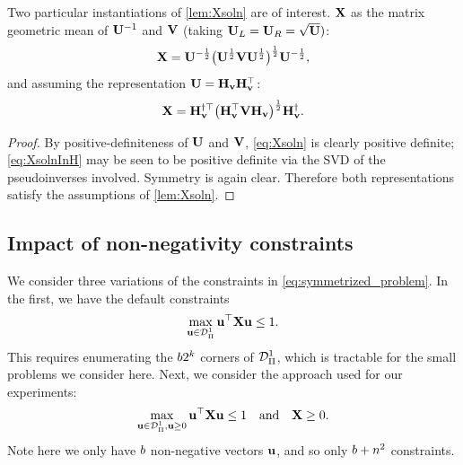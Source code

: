 \begin{cor}\label{cor:reps_for_x}
Two particular instantiations of \cref{lem:Xsoln} are of interest. $\mathbf{X}$ as the matrix geometric mean of $\mathbf{U}^{-1}$ and $\mathbf{V}$ (taking $\mathbf{U}_L = \mathbf{U}_R = \sqrt{\mathbf{U}})$:
\begin{equation}\label{eq:Xsoln}
\mathbf{X} = \mathbf{U}^{-\frac{1}{2}} \big(\mathbf{U}^\frac{1}{2} \mathbf{V} \mathbf{U}^\frac{1}{2} \big)^\frac{1}{2} \mathbf{U}^{-\frac{1}{2}},
\end{equation}
and assuming the representation $\mathbf{U} = \mathbf{H}_{\mathbf{v}} \mathbf{H}_{\mathbf{v}}^\top$:
\begin{equation}\label{eq:XsolnInH}
\mathbf{X} = \mathbf{H}_{\mathbf{v}}^{\dagger\top} \big(\mathbf{H}_{\mathbf{v}}^\top \mathbf{V} \mathbf{H}_{\mathbf{v}}\big)^\frac{1}{2} \mathbf{H}_{\mathbf{v}}^\dagger.
\end{equation}
\end{cor}

\begin{proof}

 By positive-definiteness of $\mathbf{U}$ and $\mathbf{V}$, \cref{eq:Xsoln} is clearly positive definite; \cref{eq:XsolnInH} may be seen to be positive definite via the SVD of the pseudoinverses involved. Symmetry is again clear. Therefore both representations satisfy the assumptions of \cref{lem:Xsoln}.
\end{proof}

\newcommand{\hPi}{\widehat{\Pi}}
\newcommand{\posnegu}{\textbf{$\pm$-contrib}}
\newcommand{\Xnn}{\textbf{non-neg $\bfX \ge 0$}}
\newcommand{\XPinn}{\textbf{non-neg $\bfX_\hPi \ge 0$}}
\subsection{Impact of non-negativity constraints} \label{sec:nonneg}

We consider three variations of the constraints in  \cref{eq:symmetrized_problem}. In the first, we have the default constraints
\begin{equation}\label{eq:default-constraint}
\max_{\mathbf{u} \in \mathcal{D}^1_\Pi} \mathbf{u}^\top \mathbf{X} \mathbf{u} \le 1.
\end{equation}
This requires enumerating the $b 2^k$ corners of $\mathcal{D}^1_\Pi$, which is tractable for the small problems we consider here.
Next, we consider the approach used for our experiments:
\begin{equation} \label{eq:nonneg-constraint}
\max_{\mathbf{u} \in \mathcal{D}^1_\Pi, \mathbf{u} \ge 0} \mathbf{u}^\top \mathbf{X} \mathbf{u} \le 1
\quad \text{and} \quad
\mathbf{X} \ge 0.
\end{equation}
Note here we only have $b$ non-negative vectors $\mathbf{u}$, and so only $b + n^2$ constraints.

